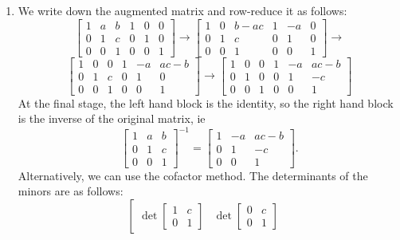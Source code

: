 \documentclass{amsart}
\newcommand{\xra}{\xrightarrow}
\renewcommand{\:}       {\colon}
\newcommand{\mks}[1]    {}
\newcommand{\mk}        {}
\begin{document}
\begin{enumerate}
 \item %
  We write down the augmented matrix and row-reduce it as follows:
  \[ \left[\begin{array}{ccc|ccc}
      1 & a & b & 1 & 0 & 0 \\ 
      0 & 1 & c & 0 & 1 & 0 \\ 
      0 & 0 & 1 & 0 & 0 & 1 
     \end{array}\right] \mk \xra{}
     \left[\begin{array}{ccc|ccc}
      1 & 0 & b-ac & 1 & -a & 0 \\ 
      0 & 1 & c & 0 & 1 & 0 \\ 
      0 & 0 & 1 & 0 & 0 & 1 
     \end{array}\right] \xra{}
  \] \[
     \left[\begin{array}{ccc|ccc}
      1 & 0 & 0 & 1 & -a & ac-b \\ 
      0 & 1 & c & 0 & 1 & 0 \\ 
      0 & 0 & 1 & 0 & 0 & 1 
     \end{array}\right] \xra{}
     \left[\begin{array}{ccc|ccc}
      1 & 0 & 0 & 1 & -a & ac-b \\ 
      0 & 1 & 0 & 0 & 1 & -c \\ 
      0 & 0 & 1 & 0 & 0 & 1 
     \end{array}\right] \mks{2M 2A}
  \]
  At the final stage, the left hand block is the identity, so
  the right hand block is the inverse of the original matrix, ie
  \[ \left[\begin{array}{ccc}
      1 & a & b \\ 0 & 1 & c \\ 0 & 0 & 1 
     \end{array}\right]^{-1} = 
     \left[\begin{array}{ccc}
      1 & -a & ac-b \\ 0 & 1 & -c \\ 0 & 0 & 1 
     \end{array}\right] \mk.
  \]
  Alternatively, we can use the cofactor method.  The determinants of
  the minors are as follows:
  \[ \left[\begin{array}{ccc}
      \det\left[\begin{array}{cc} 1&c\\0&1 \end{array}\right] &
      \det\left[\begin{array}{cc} 0&c\\0&1 \end{array}\right] &

\end{array}\]
\end{enumerate}
\end{document}
